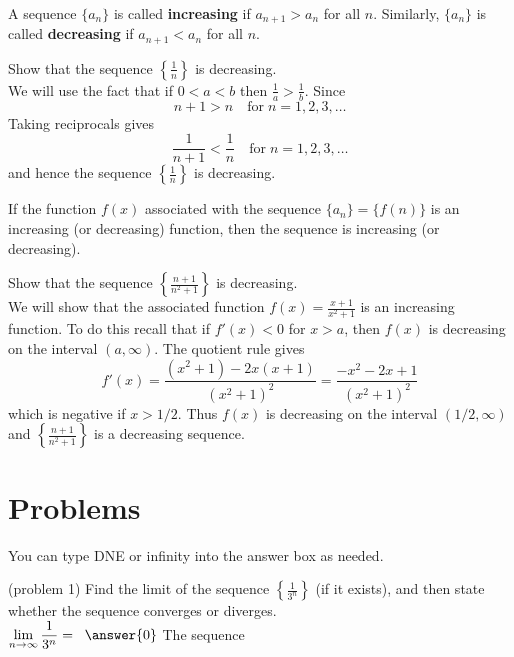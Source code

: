 \documentclass[handout]{ximera}
\begin{document}
\begin{definition} 
A sequence $\{a_n\}$ is called {\bf increasing} if $a_{n+1} > a_n$ for all $n$.
Similarly, $\{a_n\}$ is called {\bf decreasing} if $a_{n+1} < a_n$ for all $n$.
\end{definition}

\begin{example}
Show that the sequence $\left\{\frac{1}{n}\right\}$ is decreasing.\\
We will use the fact that if $0<a<b$ then $\frac{1}{a} > \frac{1}{b}$.  Since
\[
n+1 > n \quad \text{for} \; n = 1, 2, 3, \ldots
\]
Taking reciprocals gives
\[
\frac{1}{n+1} < \frac{1}{n} \quad \text{for} \; n = 1, 2, 3, \ldots
\]
and hence the sequence $\left\{\frac{1}{n}\right\}$ is decreasing.
\end{example}


\begin{remark}
If the function $f(x)$ associated with the sequence $\{a_n\} = \{f(n)\}$ is an increasing (or decreasing) function, then the sequence 
is increasing (or decreasing).
\end{remark}

\begin{example}
Show that the sequence $\left\{\frac{n+1}{n^2 + 1}\right\}$ is decreasing.\\
We will show that the associated function $f(x) = \frac{x+1}{x^2 + 1}$ is an increasing function. To do this recall that if $f'(x)< 0$ for $x>a$,
then $f(x)$ is decreasing on the interval $(a,\infty)$. The quotient rule gives
\[
f'(x) = \frac{\left(x^2+1\right) - 2x(x+1)}{(x^2+1)^2} = \frac{-x^2-2x+1}{(x^2+1)^2}
\]
which is negative if $x>1/2$. Thus $f(x)$ is decreasing on the interval $(1/2, \infty)$ and $\left\{\frac{n+1}{n^2 + 1} \right\}$
is a decreasing sequence.
\end{example}

\section{Problems}
You can type DNE or infinity into the answer box as needed.

\begin{problem}(problem 1)
Find the limit of the sequence $\displaystyle \left\{\frac{1}{3^n}\right\}$ (if it exists), and then state whether the sequence converges or diverges.\\
$\displaystyle \lim_{n\to \infty} \frac{1}{3^n} = \;\;\answer{0}$ \quad
The sequence 
\end{problem}
\end{document}
